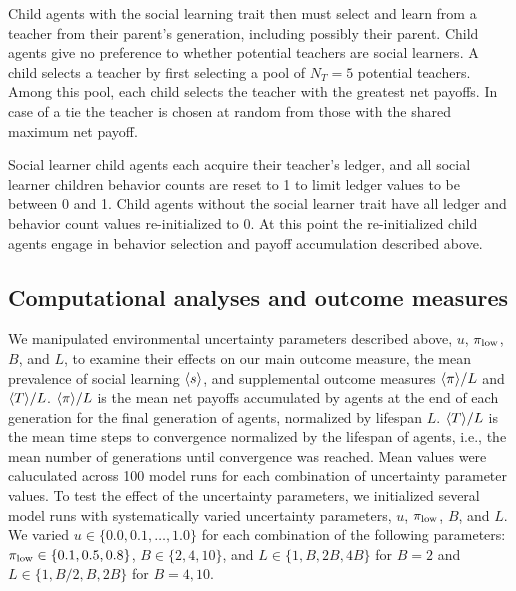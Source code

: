 \documentclass[letterpaper,11.5pt]{scrartcl}
\begin{document}
Child agents with the social learning trait then must select and learn from a
teacher from their parent's generation, including possibly their parent.
Child agents give no preference to whether potential teachers are social 
learners. A child selects a teacher by first selecting a pool of $N_T = 5$ potential
teachers. Among this pool, each child selects the teacher with the greatest
net payoffs. In case of a tie the teacher is chosen at random from those with
the shared maximum net payoff. 

Social learner child agents each acquire their teacher's ledger, and all social
learner children behavior counts are reset to 1 to limit ledger values to be between
0 and 1. Child agents without the social learner trait have all ledger and behavior
count values re-initialized to 0. At this point the re-initialized child agents
engage in behavior selection and payoff accumulation described above. 


\subsection{Computational analyses and outcome measures}

We manipulated environmental uncertainty parameters described above, $u$,
$\pi_{\mathrm{low}}$, $B$, and $L$, to examine their effects on our
main outcome measure, the mean prevalence of social learning $\langle s \rangle$, 
and supplemental outcome measures $\langle \pi \rangle / L$ and $\langle T \rangle / L$. $\langle \pi \rangle / L$ is the
mean net payoffs accumulated by agents at the end of each generation for the
final generation of agents, normalized by lifespan $L$. $\langle T \rangle / L$ is the 
mean time steps to convergence normalized by the lifespan of agents, i.e., the
mean number of generations until convergence was reached. Mean values were
caluculated across 100 model runs for each combination of uncertainty parameter values.
To test the effect of the uncertainty parameters, 
we initialized several model runs with
systematically varied uncertainty parameters, $u$, $\pi_{\mathrm{\mathrm{low}}}$, $B$,
and $L$. We varied $u \in \{0.0, 0.1, \ldots, 1.0\}$ for each combination of
the following parameters:
$\pi_{\mathrm{low}} \in \{0.1, 0.5, 0.8\}$, $B \in \{2, 4, 10\}$, and
$L \in \{1, B, 2B, 4B\}$ for $B=2$ and $L \in \{1, B/2, B, 2B\}$ for $B=4,10$.
\end{document}
